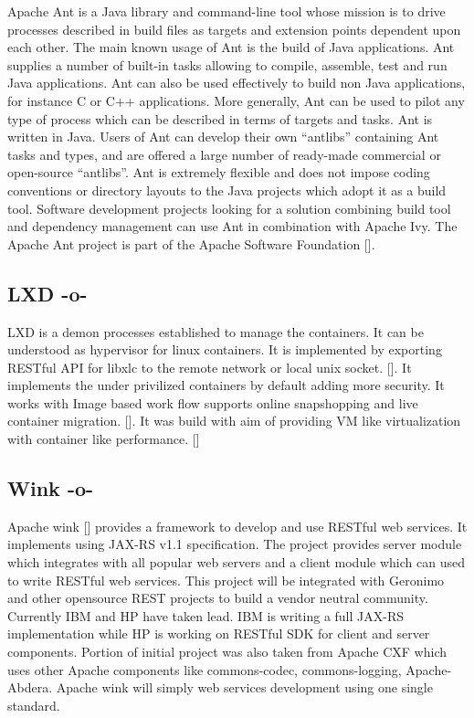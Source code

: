 Apache Ant is a Java library and command-line tool whose mission is to
drive processes described in build files as targets and extension
points dependent upon each other. The main known usage of Ant is the
build of Java applications. Ant supplies a number of built-in tasks
allowing to compile, assemble, test and run Java applications. Ant can
also be used effectively to build non Java applications, for instance
C or C++ applications. More generally, Ant can be used to pilot any
type of process which can be described in terms of targets and
tasks. Ant is written in Java. Users of Ant can develop their own
``antlibs'' containing Ant tasks and types, and are offered a large
number of ready-made commercial or open-source ``antlibs''. Ant is
extremely flexible and does not impose coding conventions or directory
layouts to the Java projects which adopt it as a build tool. Software
development projects looking for a solution combining build tool and
dependency management can use Ant in combination with Apache Ivy. The
Apache Ant project is part of the Apache Software
Foundation [\cite{ant-www}].

\subsection{LXD -o-}

LXD is a demon processes established to manage the containers. It can
be understood as hypervisor for linux containers. It is implemented by
exporting RESTful API for libxlc to the remote network or local unix
socket. [\cite{www-lxd-thevarguy}]. It implements the under privilized
containers by default adding more security. It works with Image based
work flow supports online snapshopping and live container
migration. [\cite{www-lxd-lists-linux}]. It was build with aim of
providing VM like virtualization with container like
performance. [\cite{www-lxd-ubuntu}]

\subsection{Wink -o-}

Apache wink [\cite{www-apache-wink}] provides a framework to develop and
use RESTful web services. It implements using JAX-RS v1.1
specification. The project provides server module which integrates
with all popular web servers and a client module which can used to
write RESTful web services. This project will be integrated with
Geronimo and other opensource REST projects to build a vendor neutral
community. Currently IBM and HP have taken lead. IBM is writing a full
JAX-RS implementation while HP is working on RESTful SDK for client
and server components.  Portion of initial project was also taken from
Apache CXF which uses other Apache components like commons-codec,
commons-logging, Apache-Abdera. Apache wink will simply web services
development using one single standard.

